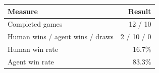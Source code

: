 \begin{tabular}{lr}
\toprule
Measure & Result \\
\midrule
Completed games & 12 / 10 \\
Human wins / agent wins / draws & 2 / 10 / 0 \\
Human win rate & 16.7\% \\
Agent win rate & 83.3\% \\
\bottomrule
\end{tabular}

